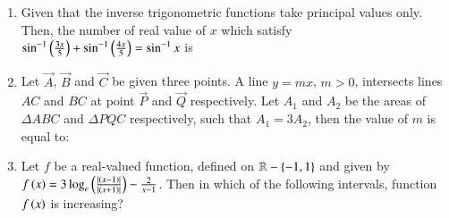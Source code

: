 \documentclass[journal,12pt,onecolumn]{IEEEtran}
\theoremstyle{remark}
\begin{document}
\begin{enumerate}
\item Given that the inverse trigonometric functions take principal values only. Then, the number of real value of $x$ which satisfy $\sin^{-1}\left(\frac{3x}{5}\right)+\sin^{-1}\left(\frac{4x}{5}\right) = \sin^{-1}x$ is 

\hfill{}
\begin{enumerate}
\end{enumerate}

\item Let $\vec{A}$, $\vec{B}$ and $\vec{C}$ be given three points. A line $y = mx$, $m > 0$, intersects lines $AC$ and $BC$ at point $\vec{P}$ and $\vec{Q}$ respectively. Let $A_1$ and $A_2$ be the areas of $\Delta ABC$ and $\Delta PQC$ respectively, such that $A_1 = 3A_2$, then the value of $m$ is equal to:

\hfill{}
\begin{enumerate}
\end{enumerate}

\item Let $f$ be a real-valued function, defined on $\mathbb{R}-\left\{-1, 1\right\}$ and given by $f\left(x\right) = 3\log_e\left({\frac{\left\vert\left(x-1\right)\right\vert}{\left\vert\left(x+1\right)\right\vert}}\right)-\frac{2}{x-1}$. Then in which of the following intervals, function $f\left(x\right)$ is increasing?

\hfill{}
\begin{enumerate}
\end{enumerate}

\end{enumerate}
\end{document}
